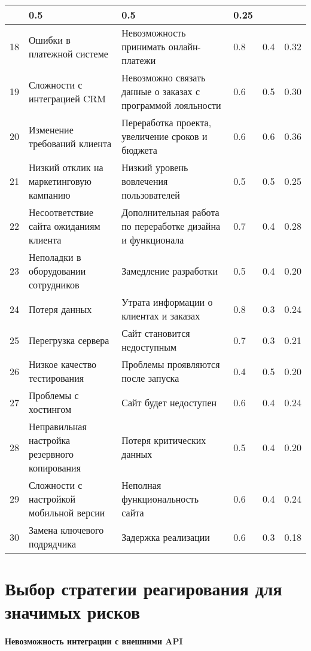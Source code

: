 \begin{small}
\begin{longtable}{|p{0.5cm}|p{3.5cm}|p{4cm}|p{3cm}|p{2cm}|p{1.5cm}|}
			& 0.5 & 0.5 & 0.25 \\ \hline
		18 & Ошибки в платежной системе
			& Невозможность принимать онлайн-платежи
			& 0.8 & 0.4 & 0.32 \\ \hline
		19 & Сложности с интеграцией CRM
			& Невозможно связать данные о заказах с программой лояльности
			& 0.6 & 0.5 & 0.30 \\ \hline
		20 & Изменение требований клиента
			& Переработка проекта, увеличение сроков и бюджета
			& 0.6 & 0.6 & 0.36 \\ \hline
		21 & Низкий отклик на маркетинговую кампанию
			& Низкий уровень вовлечения пользователей
			& 0.5 & 0.5 & 0.25 \\ \hline
		22 & Несоответствие сайта ожиданиям клиента
			& Дополнительная работа по переработке дизайна и функционала
			& 0.7 & 0.4 & 0.28 \\ \hline
		23 & Неполадки в оборудовании сотрудников
			& Замедление разработки
			& 0.5 & 0.4 & 0.20 \\ \hline
		24 & Потеря данных
			& Утрата информации о клиентах и заказах
			& 0.8 & 0.3 & 0.24 \\ \hline
		25 & Перегрузка сервера
			& Сайт становится недоступным
			& 0.7 & 0.3 & 0.21 \\ \hline
		26 & Низкое качество тестирования
			& Проблемы проявляются после запуска
			& 0.4 & 0.5 & 0.20 \\ \hline
		27 & Проблемы с хостингом
			& Сайт будет недоступен
			& 0.6 & 0.4 & 0.24 \\ \hline
		28 & Неправильная настройка резервного копирования
			& Потеря критических данных
			& 0.5 & 0.4 & 0.20 \\ \hline
		29 & Сложности с настройкой мобильной версии
			& Неполная функциональность сайта
			& 0.6 & 0.4 & 0.24 \\ \hline
		30 & Замена ключевого подрядчика
			& Задержка реализации
			& 0.6 & 0.3 & 0.18 \\ \hline
	\end{longtable}
\end{small}

\clearpage

\section*{Выбор стратегии реагирования для значимых рисков}

\paragraph{Невозможность интеграции с внешними API}

